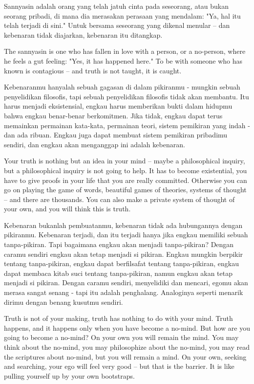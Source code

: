 \bahasa
Sannyasin adalah orang yang telah jatuh cinta pada seseorang, atau bukan seorang pribadi, di mana dia merasakan perasaan yang mendalam: "Ya, hal itu telah terjadi di sini." Untuk bersama seseorang yang dikenal menular -- dan kebenaran tidak diajarkan, kebenaran itu ditangkap.

\english
The sannyasin is one who has fallen in love with a person, or a no-person, where he feels a gut feeling: "Yes, it has happened here." To be with someone who has known is contagious -- and truth is not taught, it is caught.

\bahasa
Kebenaranmu hanyalah sebuah gagasan di dalam pikiranmu - mungkin sebuah penyelidikan filosofis, tapi sebuah penyelidikan filosofis tidak akan membantu. Itu harus menjadi eksistensial, engkau harus memberikan bukti dalam hidupmu bahwa engkau benar-benar berkomitmen. Jika tidak, engkau dapat terus memainkan permainan kata-kata, permainan teori, sistem pemikiran yang indah - dan ada ribuan. Engkau juga dapat membuat sistem pemikiran pribadimu sendiri, dan engkau akan menganggap ini adalah kebenaran.

\english
Your truth is nothing but an idea in your mind -- maybe a philosophical inquiry, but a philosophical inquiry is not going to help. It has to become existential, you have to give proofs in your life that you are really committed. Otherwise you can go on playing the game of words, beautiful games of theories, systems of thought -- and there are thousands. You can also make a private system of thought of your own, and you will think this is truth.

\bahasa
Kebenaran bukanlah pembuatanmu, kebenaran tidak ada hubungannya dengan pikiranmu. Kebenaran terjadi, dan itu terjadi hanya jika engkau memiliki sebuah tanpa-pikiran. Tapi bagaimana engkau akan menjadi tanpa-pikiran? Dengan caramu sendiri engkau akan tetap menjadi si pikiran. Engkau mungkin berpikir tentang tanpa-pikiran, engkau dapat berfilsafat tentang tanpa-pikiran, engkau dapat membaca kitab suci tentang tanpa-pikiran, namun engkau akan tetap menjadi si pikiran. Dengan caramu sendiri, menyelidiki dan mencari, egomu akan merasa sangat senang - tapi itu adalah penghalang. Analoginya seperti menarik dirimu dengan benang kusutmu sendiri.

\english
Truth is not of your making, truth has nothing to do with your mind. Truth happens, and it happens only when you have become a no-mind. But how are you going to become a no-mind? On your own you will remain the mind. You may think about the no-mind, you may philosophize about the no-mind, you may read the scriptures about no-mind, but you will remain a mind. On your own, seeking and searching, your ego will feel very good -- but that is the barrier. It is like pulling yourself up by your own bootstraps.

